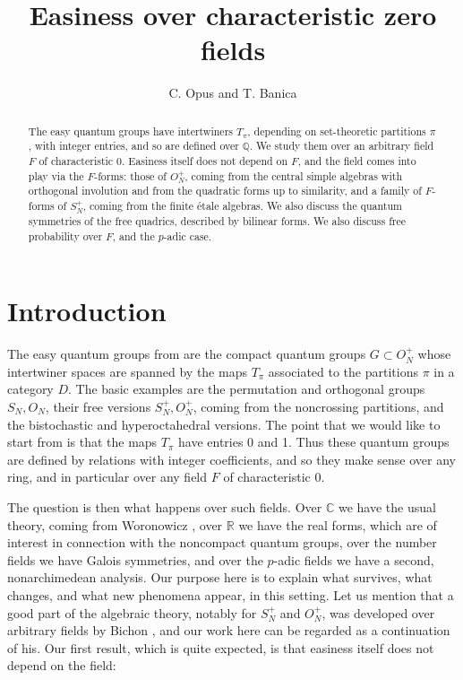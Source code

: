 \documentclass[11pt]{amsart}
\theoremstyle{definition}
\begin{document}
\title[Easiness over characteristic zero fields]{Easiness over characteristic zero fields}

\author{C. Opus and T. Banica}


\begin{abstract}
The easy quantum groups have intertwiners $T_\pi$, depending on set-theoretic partitions $\pi$, with integer entries, and so are defined over $\mathbb Q$. We study them over an arbitrary field $F$ of characteristic 0. Easiness itself does not depend on $F$, and the field comes into play via the $F$-forms: those of $O_N^+$, coming from the central simple algebras with orthogonal involution and from the quadratic forms up to similarity, and a family of $F$-forms of $S_N^+$, coming from the finite étale algebras. We also discuss the quantum symmetries of the free quadrics, described by bilinear forms. We also discuss free probability over $F$, and the $p$-adic case.
\end{abstract}

\maketitle

\tableofcontents

\section*{Introduction}

The easy quantum groups from \cite{bsp} are the compact quantum groups $G\subset O_N^+$ whose intertwiner spaces are spanned by the maps $T_\pi$ associated to the partitions $\pi$ in a category $D$. The basic examples are the permutation and orthogonal groups $S_N,O_N$, their free versions $S_N^+,O_N^+$, coming from the noncrossing partitions, and the bistochastic and hyperoctahedral versions. The point that we would like to start from is that the maps $T_\pi$ have entries 0 and 1. Thus these quantum groups are defined by relations with integer coefficients, and so they make sense over any ring, and in particular over any field $F$ of characteristic 0.

The question is then what happens over such fields. Over $\mathbb C$ we have the usual theory, coming from Woronowicz \cite{wo1,wo2}, over $\mathbb R$ we have the real forms, which are of interest in connection with the noncompact quantum groups, over the number fields we have Galois symmetries, and over the $p$-adic fields we have a second, nonarchimedean analysis. Our purpose here is to explain what survives, what changes, and what new phenomena appear, in this setting. Let us mention that a good part of the algebraic theory, notably for $S_N^+$ and $O_N^+$, was developed over arbitrary fields by Bichon \cite{bic,bi3}, and our work here can be regarded as a continuation of his. Our first result, which is quite expected, is that easiness itself does not depend on the field:
\end{document}
